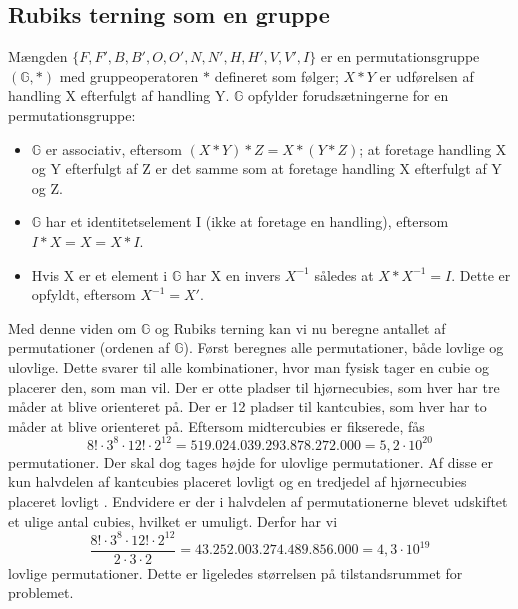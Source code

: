 \documentclass[../main.tex]{subfiles}
\begin{document}
\subsection*{Rubiks terning som en gruppe}
Mængden $\{F, F', B, B', O, O', N, N', H, H', V, V', I\}$ er en permutationsgruppe $(\mathbb{G}, *)$ med gruppeoperatoren $*$ defineret som følger; $X*Y$ er udførelsen af handling X efterfulgt af handling Y.
$\mathbb{G}$ opfylder forudsætningerne for en permutationsgruppe: 
\begin{itemize}
	\item $\mathbb{G}$ er associativ, eftersom $(X*Y)*Z=X*(Y*Z)$; at foretage handling X og Y efterfulgt af Z er det samme som at foretage handling X efterfulgt af Y og Z. 
	\item $\mathbb{G}$ har et identitetselement I (ikke at foretage en handling), eftersom $I*X = X = X*I$. 
	\item Hvis X er et element i $\mathbb{G}$ har X en invers $X^{-1}$ således at $X*X^{-1}=I$. Dette er opfyldt, eftersom  $X^{-1}=X'$.  
\end{itemize} 
Med denne viden om $\mathbb{G}$ og Rubiks terning kan vi nu beregne antallet af permutationer (ordenen af $\mathbb{G}$).
Først beregnes alle permutationer, både lovlige og ulovlige.
Dette svarer til alle kombinationer, hvor man fysisk tager en cubie og placerer den, som man vil.
Der er otte pladser til hjørnecubies, som hver har tre måder at blive orienteret på.
Der er 12 pladser til kantcubies, som hver har to måder at blive orienteret på.
Eftersom midtercubies er fikserede, fås
\begin{equation*}
	8!\cdot3^8\cdot12!\cdot2^{12}=519.024.039.293.878.272.000=5,2\cdot10^{20}
\end{equation*}
permutationer.
Der skal dog tages højde for ulovlige permutationer.
Af disse er kun halvdelen af kantcubies placeret lovligt og en tredjedel af hjørnecubies placeret lovligt \cite{GroupTheory}.
Endvidere er der i halvdelen af permutationerne blevet udskiftet et ulige antal cubies, hvilket er umuligt. Derfor har vi
$$\frac{8!\cdot3^8\cdot12!\cdot2^{12}}{2\cdot3\cdot2}=43.252.003.274.489.856.000=4,3\cdot10^{19}$$
lovlige permutationer. Dette er ligeledes størrelsen på tilstandsrummet for problemet.
\end{document}
